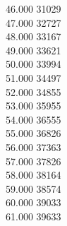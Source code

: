 { 46.000	31029 \\
 47.000	32727 \\
 48.000	33167 \\
 49.000	33621 \\
 50.000	33994 \\
 51.000	34497 \\
 52.000	34855 \\
 53.000	35955 \\
 54.000	36555 \\
 55.000	36826 \\
 56.000	37363 \\
 57.000	37826 \\
 58.000	38164 \\
 59.000	38574 \\
 60.000	39033 \\
 61.000	39633 \\
}
